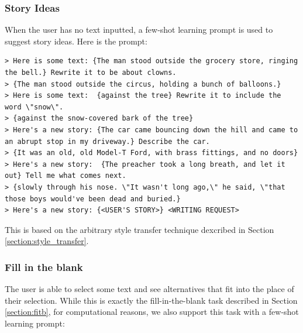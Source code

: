 \subsubsection{Story Ideas}
When the user has no text inputted, a few-shot learning prompt is used to suggest story ideas. Here is the prompt:
\begin{verbatim}
> Here is some text: {The man stood outside the grocery store, ringing the bell.} Rewrite it to be about clowns.
> {The man stood outside the circus, holding a bunch of balloons.}
> Here is some text:  {against the tree} Rewrite it to include the word \"snow\".
> {against the snow-covered bark of the tree}
> Here's a new story: {The car came bouncing down the hill and came to an abrupt stop in my driveway.} Describe the car.
> {It was an old, old Model-T Ford, with brass fittings, and no doors}
> Here's a new story:  {The preacher took a long breath, and let it out} Tell me what comes next.
> {slowly through his nose. \"It wasn't long ago,\" he said, \"that those boys would've been dead and buried.}
> Here's a new story: {<USER'S STORY>} <WRITING REQUEST>
\end{verbatim}
This is based on the arbitrary style transfer technique dexcribed in Section \ref{section:style_transfer}.

\subsubsection{Fill in the blank}
The user is able to select some text and see alternatives that fit into the place of their selection.
While this is exactly the fill-in-the-blank task described in Section \ref{section:fitb}, for computational reasons, we also support this task with a few-shot learning prompt:


